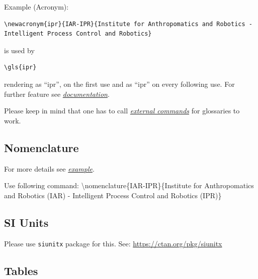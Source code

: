 Example (Acronym):
{\small
\begin{verbatim}
\newacronym{ipr}{IAR-IPR}{Institute for Anthropomatics and Robotics - Intelligent Process Control and Robotics}
\end{verbatim}
} 
is used by
{\small
\begin{verbatim}
\gls{ipr}
\end{verbatim}
}
rendering as ``\gls{ipr}'', on the first use and as ``\gls{ipr}'' on every following use. For further feature see \href{https://en.wikibooks.org/wiki/LaTeX/Glossary}{\textit{documentation}}.

Please keep in mind that one has to call \href{https://www.dickimaw-books.com/cgi-bin/faq.cgi?action=view&categorylabel=glossaries#noglossary}{\textit{external commands}} for glossaries to work.


\subsection{Nomenclature}
For more details see \href{https://tex.stackexchange.com/questions/27824/using-package-nomencl}{\textit{example}}.

Use following command:
\textbackslash nomenclature\{IAR-IPR\}\{Institute for Anthropomatics and Robotics (IAR) - Intelligent Process Control and Robotics (IPR)\}


\subsection{SI Units}
Please use \texttt{siunitx} package for this. See:  \url{https://ctan.org/pkg/siunitx}

\subsection{Tables}
\begin{table}[H]
\caption{Tables have caption on top.}
\label{tab:table_caption}
\centering
{}
\end{table}

